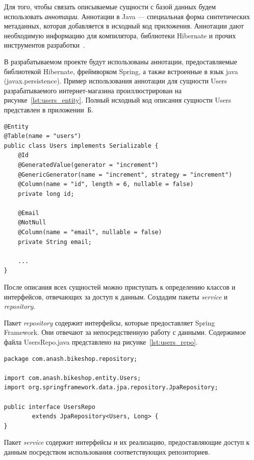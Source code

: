 Для того, чтобы связать описываемые сущности с базой данных будем использовать
\textit{аннотации}. Аннотации в Java --- специальная форма синтетических метаданных,
которая добавляется в исходный код приложения. Аннотации дают необходимую информацию
для компилятора, библиотеки Hibernate и прочих инструментов разработки~\cite{jpa_entities_design}.

В разрабатываемом проекте будут использованы аннотации, предоставляемые библиотекой
Hibernate, фреймворком Spring, а также встроенные в язык java (javax.persistence).
Пример использования аннотации для сущности Users разрабатываемого интернет-магазина
проиллюстрирован на рисунке~\ref{lst:users_entity}. Полный исходный код описания
сущности Users представлен в приложении~Б.

\begin{lstlisting}[caption=Пример использования Java-аннотаций,label=lst:users_entity]
@Entity
@Table(name = "users")
public class Users implements Serializable {
    @Id
    @GeneratedValue(generator = "increment")
    @GenericGenerator(name = "increment", strategy = "increment")
    @Column(name = "id", length = 6, nullable = false)
    private long id;

    @Email
    @NotNull
    @Column(name = "email", nullable = false)
    private String email;

    ...
}
\end{lstlisting}

После описания всех сущностей можно приступать к определению классов и интерфейсов,
отвечающих за доступ к данным. Создадим пакеты \textit{service} и \textit{repository}.

Пакет \textit{repository} содержит интерфейсы, которые предоставляет Spring Framework.
Они отвечают за непосредственную работу с данными. Содержимое файла UsersRepo.java
представлено на рисунке~\ref{lst:users_repo}.

\begin{lstlisting}[caption=Содержимое файла UsersRepo.java,label=lst:users_repo]
package com.anash.bikeshop.repository;

import com.anash.bikeshop.entity.Users;
import org.springframework.data.jpa.repository.JpaRepository;

public interface UsersRepo
        extends JpaRepository<Users, Long> {
}
\end{lstlisting}

Пакет \textit{service} содержит интерфейсы и их реализацию, предоставляющие доступ
к данным посредством использования соответствующих репозиториев.

